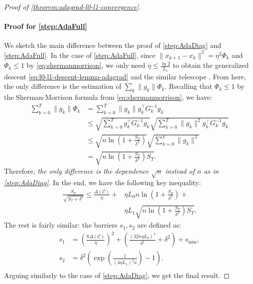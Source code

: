 \documentclass{article}
\theoremstyle{plain}
\theoremstyle{definition}
\theoremstyle{remark}
\newcommand{\norm}[1]{\| #1 \|}
\begin{document}
\begin{proof}[Proof of \cref{theorem:adagrad-l0-l1-convergence}]
    \paragraph{Proof for \ref{step:AdaFull}}
    We sketch the main difference between the proof of \ref{step:AdaDiag} and \ref{step:AdaFull}.
    In the case of \ref{step:AdaFull},
    since $\norm{x_{k+1} - x_k}^2 = \eta^2 \Phi_k$ and
    $\Phi_k \leq 1$ by \eqref{eq:shermanmorrison},
    we only need
    $\eta \leq \frac{\ln 2}{L_1}$ to obtain the generalized descent \eqref{eq:l0-l1-descent-lemma-adagrad} and the similar telescope . From here, the only difference is the estimation of $\sum_k \|g_k\|\Phi_k$.
    Recalling that $\Phi_k \leq 1$ by the Sherman-Morrison formula from \eqref{eq:shermanmorrison}, 
    we have:
    \begin{equation*}
        \begin{aligned}
            \sum_{k=0}^T \|g_k\|\Phi_k &= \sum_{k = 0}^T \|g_k\| g_k^\top G_k^{-1}g_k \\
            &\leq \sqrt{\sum_{k = 0}^T g_k^\top G_k^{-1}g_k} \sqrt{\sum_{k = 0}^T \|g_k\|^2g_k^\top G_k^{-1}g_k}\\
            &\leq \sqrt{n\ln\left(1 + \frac{S_T}{\delta^2}\right)}\sqrt{\sum_{k=0}^T \|g_k\|^2}\\
            &= \sqrt{n\ln\left(1 + \frac{S_T}{\delta^2}\right)S_T}.
        \end{aligned}
    \end{equation*}
    Therefore, \emph{the only difference is the dependence $\sqrt{n}$ instead of $n$ as in \ref{step:AdaDiag}}.
    In the end, we have the following key inequality:
    \begin{equation}
        \label{eq:key-inequality-adafull}
        \begin{aligned}
            \frac{S_T}{\sqrt{S_T + \delta^2}} \leq \frac{\Delta(\mathcal{C})}{\eta} + &\eta L_0 n \ln\left(1 + \frac{S_T}{\delta^2}\right) + \\
            &\eta L_1 \sqrt{n\ln\left(1 + \frac{S_T}{\delta^2}\right)S_T}.
        \end{aligned}
    \end{equation}
    The rest is fairly similar: the barriers $s_1,s_2$ are defined as:
    \begin{equation}
        \label{eq:s1-s2-construction-adafull}
        \begin{aligned}
            s_1 &= \left(\frac{8 \Delta(\mathcal{C})}{\eta}\right)^2 + \left(\frac{(32n\eta L_0)^4}{\delta^2} + \delta^2\right) + s_{\min},\\
            s_2 &= \delta^2 \left(\exp\left(\frac{1}{(4\eta L_1)^2n}\right) - 1\right).\\
        \end{aligned}
    \end{equation}
    Arguing similarly to the case of \ref{step:AdaDiag}, we get the final result.
\end{proof}
\end{document}
